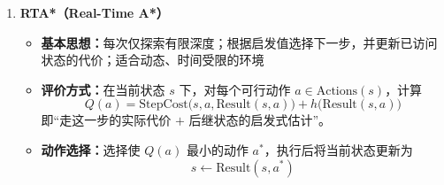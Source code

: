 \documentclass[../main.tex]{subfiles}
\begin{document}
\begin{enumerate}
{    \bigskip
    
    \textbf{例：位图索引}
    
    现有一张表，共 $8$ 行，包含“性别”和“等级”两列。  
    性别列依次为
    $$
    M,\ F,\ M,\ M,\ F,\ F,\ M,\ F
    $$
    等级列依次为
    $$
    1,\ 2,\ 2,\ 1,\ 3,\ 2,\ 3,\ 1
    $$
    
    为“性别”列建立位图索引：
    
    值 $M$ 的位图为
    $$
    10110010
    $$
    因为第 $1,3,4,7$ 行的性别为 $M$。
    
    值 $F$ 的位图为
    $$
    01001101
    $$
    因为第 $2,5,6,8$ 行的性别为 $F$。
    
    再为“等级”列建立位图索引：
    
    等级 $1$ 的位图为
    $$
    10010001
    $$
    因为第 $1,4,8$ 行的等级为 $1$；
    
    等级 $2$ 的位图为
    $$
    01100100
    $$
    因为第 $2,3,6$ 行的等级为 $2$；
    
    等级 $3$ 的位图为
    $$
    00001010
    $$
    因为第 $5,7$ 行的等级为 $3$。
    
    若查询“\textbf{性别为 $M$ 且等级为 $2$ 的员工}”，只需取出对应位图
    $$
    10110010
    $$
    和
    $$
    01100100
    $$
    然后做按位与运算：
    $$
    10110010 \land 01100100 = 00100000
    $$
    结果中只有第 $3$ 位为 $1$，因此满足条件的是\textbf{第 $3$ 行}。
    
    位图索引的本质，是把“某一行是否满足某个取值条件”编码成 $0/1$，这样多个条件查询就可以直接转化为位运算。  
    它特别适合像性别、等级这种\textbf{取值种类少}的属性。
    }
    \item \textbf{RTA*（Real-Time A*）}
    \begin{itemize}
        \item \textbf{基本思想：}每次仅探索有限深度；根据启发值选择下一步，并更新已访问状态的代价；适合动态、时间受限的环境
        
        \item \textbf{评价方式：}在当前状态 $s$ 下，对每个可行动作 $a\in \mathrm{Actions}(s)$，计算
        $$
        Q(a)=\mathrm{StepCost}\bigl(s,a,\mathrm{Result}(s,a)\bigr)+h\bigl(\mathrm{Result}(s,a)\bigr)
        $$
        即“走这一步的实际代价 $+$ 后继状态的启发式估计”。
        
        \item \textbf{动作选择：}选择使 $Q(a)$ 最小的动作 $a^*$，执行后将当前状态更新为
        $$
        s\leftarrow \mathrm{Result}(s,a^*)
        $$
        

\end{itemize}
\end{enumerate}
\end{document}
